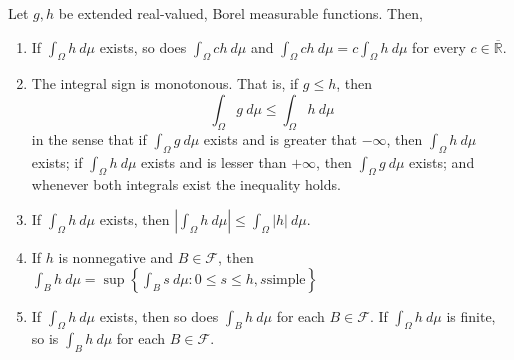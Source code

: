 \begin{prop} Let \(g,h\) be extended real-valued, Borel measurable
functions. Then,
	\begin{enumerate}
		\item\label{proposition:integral multiplicativity}If
\(\int_{\Omega}h~d\mu\) exists, so does \(\int_{\Omega}ch~d\mu\) and
\(\int_{\Omega}ch~d\mu=c\int_{\Omega}h~d\mu\) for every \(c\in\overline{\mathbb{R}}\).
		\item\label{proposition:integral monotonicity} The integral sign is
monotonous. That is, if \(g\leq h\), then
\[
		\int_{\Omega}g~d\mu\leq \int_{\Omega}h~d\mu
\] in the sense that if
\(\int_{\Omega}g~d\mu\) exists and is greater that \(-\infty\), then
\(\int_{\Omega}h~d\mu\) exists; if \(\int_{\Omega} h~d\mu\) exists and is lesser
than \(+\infty\), then \(\int_{\Omega}g~d\mu\) exists; and whenever both
integrals exist the inequality holds.
		\item If \(\int_{\Omega}h~d\mu\) exists, then
\(\left|\int_{\Omega}h~d\mu\right|\leq\int_{\Omega}|h|~d\mu.\)
		\item \label{proposition:integral in subspace coincides}If \(h\) is
nonnegative and \(B\in\mathcal{F}\), then
\(\int_B h~d\mu=\sup\left\{\int_{B}s~d\mu\colon0\leq s\leq h, s \text{
simple}\right\}\)
		\item If \(\int_{\Omega}h~d\mu\) exists, then so does \(\int_{B}h~d\mu\)
for each \(B\in\mathcal{F}\). If \(\int_{\Omega}h~d\mu\) is finite, so is
\(\int_{B}h~d\mu\) for each \(B\in\mathcal{F}\).
	\end{enumerate}
\end{prop}
